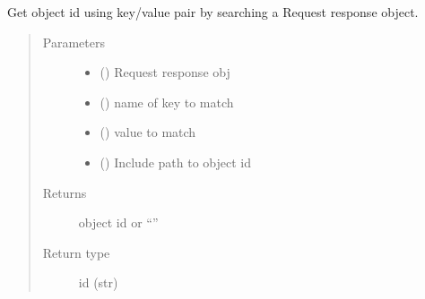 \documentclass[letterpaper,10pt,english]{sphinxmanual}
\begin{document}
\begin{fulllineitems}
\begin{fulllineitems}
\label{\detokenize{b1ddi-class:bloxone.b1ddi.search_response}}
\sphinxAtStartPar
Get object id using key/value pair by searching a
Request response object.
\begin{quote}\begin{description}
\item[{Parameters}] \leavevmode\begin{itemize}
\item {} 
\sphinxAtStartPar
{} () \textendash{} Request response obj

\item {} 
\sphinxAtStartPar
{} () \textendash{} name of key to match

\item {} 
\sphinxAtStartPar
{} () \textendash{} value to match

\item {} 
\sphinxAtStartPar
{} () \textendash{} Include path to object id

\end{itemize}

\item[{Returns}] \leavevmode
\sphinxAtStartPar
object id or “”

\item[{Return type}] \leavevmode
\sphinxAtStartPar
id (str)

\end{description}\end{quote}

\end{fulllineitems}



\end{fulllineitems}
\end{document}
